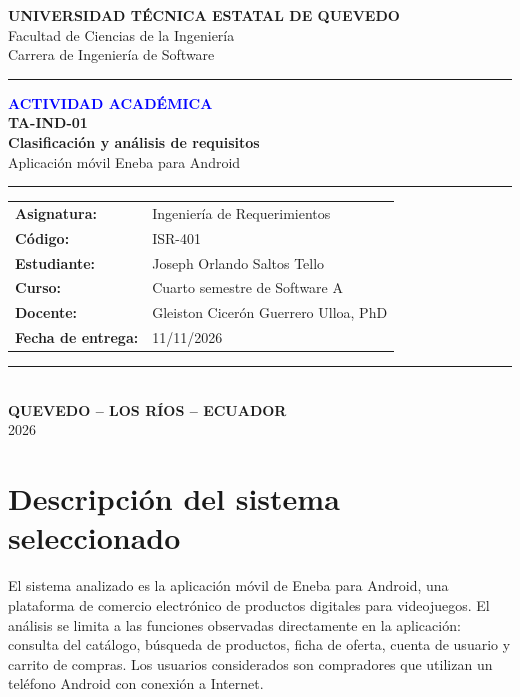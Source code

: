 \documentclass[10pt,a4paper]{article}
\renewcommand{\arraystretch}{1.18}
\begin{document}
	
	\begin{titlepage}
		\thispagestyle{empty}
		\centering
		{\large\textbf{UNIVERSIDAD TÉCNICA ESTATAL DE QUEVEDO}}\\[0.3cm]
		{\normalsize Facultad de Ciencias de la Ingeniería}\\[0.15cm]
		{\normalsize Carrera de Ingeniería de Software}
		\vspace{1.5cm}
		{\color{blue}\rule{0.85\textwidth}{1.5pt}}
		\vspace{1.2cm}
		{\large\textcolor{blue}{\textbf{ACTIVIDAD ACADÉMICA}}}\\[0.5cm]
		{\Large\textbf{TA-IND-01}}\\[0.8cm]
		{\LARGE\bfseries Clasificación y análisis de requisitos} \\[0.8cm]
		\vspace{0.2cm}
		{\large Aplicación móvil Eneba para Android}
		\vspace{1.2cm}
		{\color{blue}\rule{0.85\textwidth}{1.5pt}}
		\vspace{0.8cm}
		\begin{minipage}{0.78\textwidth}
			\renewcommand{\arraystretch}{1.8}
			\begin{tabular}{@{}>{\bfseries}p{3.5cm}p{8cm}@{}}
				Asignatura: & Ingeniería de Requerimientos \\
				Código: & ISR-401 \\
				Estudiante: & Joseph Orlando Saltos Tello \\
				Curso: & Cuarto semestre de Software A \\
				Docente: & Gleiston Cicerón Guerrero Ulloa, PhD \\
				Fecha de entrega: & 11/11/2026
			\end{tabular}
		\end{minipage}
		\vfill
		{\color{blue}\rule{0.85\textwidth}{0.8pt}}\\[0.4cm]
		{\normalsize\textbf{QUEVEDO -- LOS RÍOS -- ECUADOR}}\\[0.15cm]
		{\normalsize 2026}
	\end{titlepage}
	
	\section{Descripción del sistema seleccionado}
	
	El sistema analizado es la aplicación móvil de Eneba para Android, una plataforma de comercio electrónico de productos digitales para videojuegos. El análisis se limita a las funciones observadas directamente en la aplicación: consulta del catálogo, búsqueda de productos, ficha de oferta, cuenta de usuario y carrito de compras. Los usuarios considerados son compradores que utilizan un teléfono Android con conexión a Internet.
	
\end{document}
